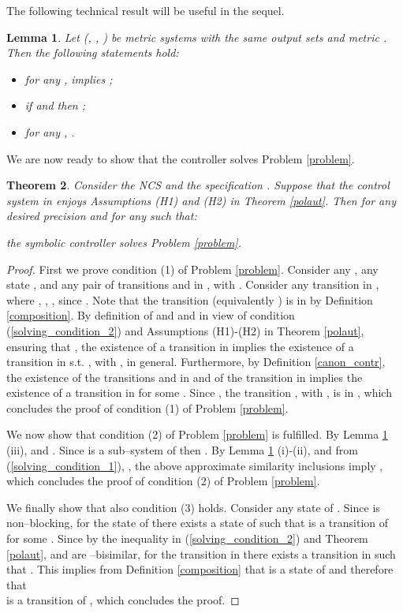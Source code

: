 \documentclass{amsart}
\newtheorem{theorem}{Theorem}[section]
\newtheorem{lemma}[theorem]{Lemma}
\begin{document}
The following technical result will be useful in the sequel.

\begin{lemma}
Let \mbox{} (, , ) be metric systems with the same output sets  and metric . Then the following statements hold:
\begin{itemize}
\item[(i)] \cite{AB-TAC07} for any ,  implies \mbox{};
\item[(ii)] \cite{AB-TAC07} if  and  then ;
\item[(iii)] \cite{PolaTAC12} for any , .
\end{itemize}
\label{lemma1}
\end{lemma}

We are now ready to show that the controller  solves Problem \ref{problem}. 

\begin{theorem}
Consider the NCS  and the specification . Suppose that the control system  in  enjoys Assumptions (H1) and (H2) in Theorem \ref{polaut}. Then for any desired precision  and for any  such that:

the symbolic controller  solves Problem \ref{problem}.
\label{Mmain}
\end{theorem}

\begin{proof}
First we prove condition (1) of Problem \ref{problem}. Consider any , any state , and any pair of transitions  and  in , with . Consider any transition  in , where , , , since . Note that the transition  (equivalently ) is in  by Definition \ref{composition}. By definition of  and  and in view of condition (\ref{solving_condition_2}) and Assumptions (H1)-(H2) in Theorem \ref{polaut}, ensuring that , the existence of a transition  in  implies the existence of a transition  in  s.t. , with , in general. Furthermore, by Definition \ref{canon_contr}, the existence of the transitions  and  in  and of the transition  in  implies the existence of a transition  in  for some . Since , the transition , with ,  is in , which concludes the proof of condition (1) of Problem \ref{problem}.

We now show that condition (2) of Problem \ref{problem} is fulfilled. By Lemma \ref{lemma1} (iii),  and . Since  is a sub--system of  then . By Lemma \ref{lemma1} (i)-(ii), and from (\ref{solving_condition_1}), , the above approximate similarity inclusions imply , which concludes the proof of condition (2) of Problem \ref{problem}. 

We finally show that also condition (3) holds. Consider any state  of . Since  is non--blocking, for the state  of  there exists a state  of  such that  is a transition of  for some . Since by the inequality in (\ref{solving_condition_2}) and Theorem \ref{polaut},  and  are --bisimilar, for the transition  in  there exists a transition  in  such that . This implies from Definition \ref{composition} that  is a state of  and therefore that \\  is a transition of , which concludes the proof.

\end{proof}
\end{document}
